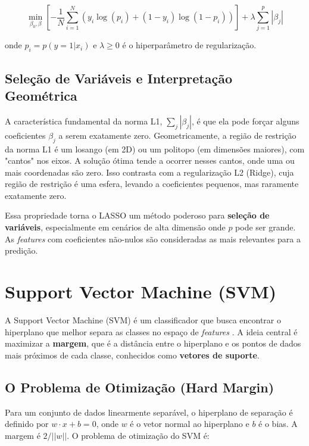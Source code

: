 \documentclass[12pt, a4paper, oneside]{report}
\begin{document}
\begin{equation}
    \min_{\beta_0, \beta} \left[ -\frac{1}{N} \sum_{i=1}^N \left( y_i \log(p_i) + (1-y_i) \log(1-p_i) \right) \right] + \lambda \sum_{j=1}^p |\beta_j|
\end{equation}

onde $p_i = p(y=1|x_i)$ e $\lambda \ge 0$ é o hiperparâmetro de regularização.

\subsection{Seleção de Variáveis e Interpretação Geométrica}

A característica fundamental da norma L1, $\sum_j |\beta_j|$, é que ela pode forçar alguns coeficientes $\beta_j$ a serem exatamente zero. Geometricamente, a região de restrição da norma L1 é um losango (em 2D) ou um politopo (em dimensões maiores), com "cantos" nos eixos. A solução ótima tende a ocorrer nesses cantos, onde uma ou mais coordenadas são zero. Isso contrasta com a regularização L2 (Ridge), cuja região de restrição é uma esfera, levando a coeficientes pequenos, mas raramente exatamente zero.

Essa propriedade torna o LASSO um método poderoso para \textbf{seleção de variáveis}, especialmente em cenários de alta dimensão onde $p$ pode ser grande. As \textit{features} com coeficientes não-nulos são consideradas as mais relevantes para a predição.

\section{Support Vector Machine (SVM)}

A Support Vector Machine (SVM) é um classificador que busca encontrar o hiperplano que melhor separa as classes no espaço de \textit{features} \cite{cortes1995}. A ideia central é maximizar a \textbf{margem}, que é a distância entre o hiperplano e os pontos de dados mais próximos de cada classe, conhecidos como \textbf{vetores de suporte}.

\subsection{O Problema de Otimização (Hard Margin)}

Para um conjunto de dados linearmente separável, o hiperplano de separação é definido por $w \cdot x + b = 0$, onde $w$ é o vetor normal ao hiperplano e $b$ é o bias. A margem é $2/||w||$. O problema de otimização do SVM é:
\end{document}
